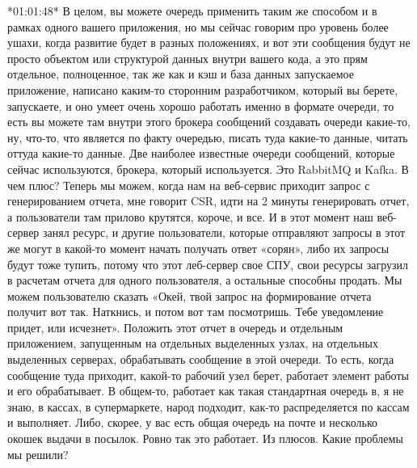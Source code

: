 \documentclass[12pt]{article} %
\begin{document}
*01:01:48*
В целом, вы можете очередь применить таким же способом и в рамках одного вашего приложения, но мы сейчас говорим про уровень более ушахи, когда развитие будет в разных положениях, и вот эти сообщения будут не просто объектом или структурой данных внутри вашего кода, а это прям отдельное, полноценное, так же как и кэш и база данных запускаемое приложение, написано каким-то сторонним разработчиком, который вы берете, запускаете, и оно умеет очень хорошо работать именно в формате очереди, то есть вы можете там внутри этого брокера сообщений создавать очереди какие-то, ну, что-то, что является  по факту очередью, писать туда какие-то данные, читать оттуда какие-то данные.  Две наиболее известные очереди сообщений, которые сейчас используются, брокера, который используется. Это RabbitMQ и Kafka.  В чем плюс? Теперь мы можем, когда нам на веб-сервис приходит запрос с генерированием отчета, мне говорит CSR, идти на 2 минуты генерировать отчет, а пользователи там прилово крутятся, короче, и все.  И в этот момент наш веб-сервер занял ресурс, и другие пользователи, которые отправляют запросы в этот же могут в какой-то момент начать получать ответ «сорян», либо их запросы будут тоже тупить, потому что этот леб-сервер свое СПУ, свои ресурсы загрузил в расчетам отчета для одного пользователя, а остальные способны продать.  Мы можем пользователю сказать «Окей, твой запрос на формирование отчета получит вот так.  Наткнись, и потом вот там посмотришь.  Тебе уведомление придет, или исчезнет».  Положить этот отчет в очередь и отдельным приложением, запущенным на отдельных выделенных узлах, на отдельных выделенных серверах, обрабатывать сообщение в этой очереди. То есть, когда сообщение туда приходит, какой-то рабочий узел берет, работает элемент работы и его обрабатывает. В общем-то, работает как такая стандартная очередь в, я не знаю, в кассах, в супермаркете, народ подходит, как-то распределяется по кассам и выполняет. Либо, скорее, у вас есть общая очередь на почте и несколько окошек выдачи в посылок. Ровно так это работает. Из плюсов. Какие проблемы мы решили?
\end{document}
